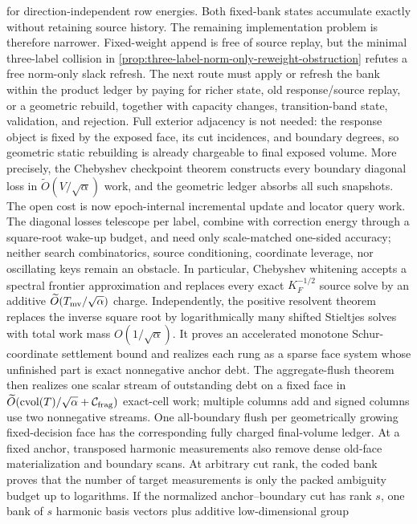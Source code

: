 for direction-independent row energies.  Both fixed-bank states accumulate
exactly without retaining source history.  The remaining implementation problem is
therefore narrower.  Fixed-weight append is free of source replay, but the
minimal three-label collision in
\cref{prop:three-label-norm-only-reweight-obstruction} refutes a free
norm-only slack refresh.  The next route must apply or refresh the bank within
the product ledger by paying for richer state, old response/source replay, or
a geometric rebuild, together with capacity changes, transition-band state,
validation, and rejection.  Full exterior adjacency is not needed: the response object is fixed by
the exposed face, its cut incidences, and boundary degrees, so geometric
static rebuilding is already chargeable to final exposed volume.  More
precisely, the Chebyshev checkpoint theorem constructs every boundary
diagonal loss in $\widetilde O(V/\sqrt\alpha)$ work, and the geometric ledger
absorbs all such snapshots.  The open cost is now epoch-internal incremental
update and locator query work.  The diagonal losses
telescope per label, combine with correction energy through a square-root
wake-up budget, and need only scale-matched one-sided accuracy; neither search
combinatorics, source conditioning, coordinate leverage, nor oscillating keys
remain an obstacle.  In particular, Chebyshev whitening accepts a spectral
frontier approximation and replaces every exact $K_F^{-1/2}$ source solve by
an additive $\widetilde O(T_{\rm mv}/\sqrt\alpha)$ charge.  Independently, the
positive resolvent theorem replaces the inverse square root by logarithmically
many shifted Stieltjes solves with total work mass $O(1/\sqrt\alpha)$.  It
proves an accelerated monotone Schur-coordinate settlement bound and realizes
each rung as a sparse face system whose unfinished part is exact nonnegative
anchor debt.  The aggregate-flush theorem then realizes one scalar stream of
outstanding debt on a fixed face in
$\widetilde O(\operatorname{cvol}(T)/\sqrt\alpha+\mathcal C_{\rm frag})$
exact-cell work; multiple columns add and signed columns use two nonnegative
streams.  One all-boundary flush per geometrically growing fixed-decision face
has the corresponding fully charged final-volume ledger.  At a fixed anchor,
transposed harmonic measurements also remove dense old-face materialization
and boundary scans.  At arbitrary cut rank, the coded bank proves that the
number of target measurements is only the packed ambiguity budget up to
logarithms.  If the normalized anchor--boundary cut has rank $s$, one
bank of $s$ harmonic basis vectors plus additive low-dimensional group
